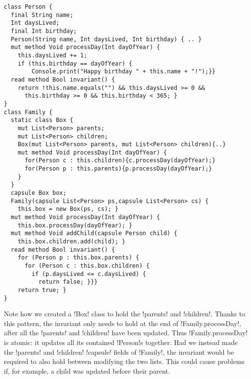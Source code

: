 \begin{lstlisting}
class Person { 
  final String name;
  Int daysLived;
  final Int birthday;
  Person(String name, Int daysLived, Int birthday) { .. }
  mut method Void processDay(Int dayOfYear) {
  	this.daysLived += 1;
    if (this.birthday == dayOfYear) {
    	Console.print("Happy birthday " + this.name + "!");}}
  read method Bool invariant() {
    return !this.name.equals("") && this.daysLived >= 0 &&
      this.birthday >= 0 && this.birthday < 365; }
}
class Family { 
  static class Box { 
    mut List<Person> parents;
    mut List<Person> children;
    Box(mut List<Person> parents, mut List<Person> children){..}
    mut method Void processDay(Int dayOfYear) {
      for(Person c : this.children){c.processDay(dayOfYear);}
      for(Person p : this.parents){p.processDay(dayOfYear);}
    }
  }
  capsule Box box;
  Family(capsule List<Person> ps,capsule List<Person> cs) {
    this.box = new Box(ps, cs); }
  mut method Void processDay(Int dayOfYear) { 
    this.box.processDay(dayOfYear); }
  mut method Void addChild(capsule Person child) { 
    this.box.children.add(child); }
  read method Bool invariant() {
    for (Person p : this.box.parents) {
      for (Person c : this.box.children) {
        if (p.daysLived <= c.daysLived) { 
          return false; }}}
    return true; }
}
\end{lstlisting}
Note how we created a \Q!Box! class to hold the \Q!parents! and \Q!children!.
Thanks to this pattern, the invariant only needs to hold at the end of \Q!Family.processDay!, after all the \Q!parents! and \Q!children! have been updated. Thus \Q!Family.processDay! is atomic: it updates all its contained \Q!Person!s together.
Had we instead made the \Q!parents! and \Q!children! \Q!capsule! fields of \Q!Family!, the invariant would be required to also hold between modifying the two lists. This could cause problems if, for example, a child was updated before their parent.

